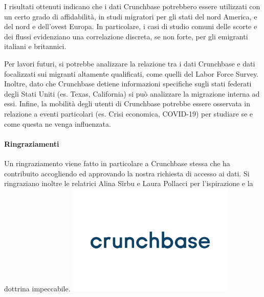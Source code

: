 I risultati ottenuti indicano che i dati Crunchbase potrebbero essere utilizzati con un certo grado di affidabilità, in studi migratori per gli stati del nord America, e del nord e dell'ovest Europa. In particolare, i casi di studio comuni delle scorte e dei flussi evidenziano una correlazione discreta, se non forte, per gli emigranti italiani e britannici.


Per lavori futuri, si potrebbe analizzare la relazione tra i dati Crunchbase e dati focalizzati sui migranti altamente qualificati, come quelli del Labor Force Survey. Inoltre, dato che Crunchbase detiene informazioni specifiche sugli stati federati degli Stati Uniti (es. Texas, California) si può analizzare la migrazione interna ad essi. Infine, la mobilità degli utenti di Crunchbase potrebbe essere osservata in relazione a eventi particolari (es. Crisi economica, COVID-19) per studiare se e come questa ne venga influenzata.
\newpage
\paragraph{Ringraziamenti}
Un ringraziamento viene fatto in particolare a Crunchbase stessa che ha contribuito accogliendo ed approvando la nostra richiesta di accesso ai dati. Si ringraziano inoltre le relatrici Alina Sîrbu e Laura Pollacci per l'ispirazione e la dottrina impeccabile. 
\centering
\href{https://www.crunchbase.com/}{\includegraphics[width=0.6\textwidth]{images/Crunchbase-Logo.wine.png}}